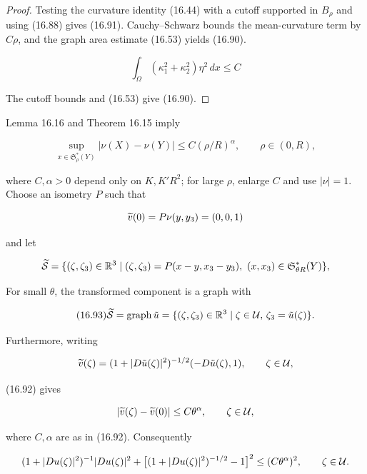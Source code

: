 \begin{proof}
\sketch Testing the curvature identity (16.44) with a cutoff supported in $B_\rho$ and using (16.88) gives (16.91). Cauchy--Schwarz bounds the mean-curvature term by $C\rho$, and the graph area estimate (16.53) yields (16.90).


\begin{equation}
\tag{16.91}
\int_{\Omega} (\kappa_1^2 + \kappa_2^2)\eta^2\,dx \leq C
\end{equation}

The cutoff bounds and (16.53) give (16.90).
\end{proof}

Lemma 16.16 and Theorem 16.15 imply

\begin{equation}
\tag{16.92}
\sup_{x \in \mathfrak{S}_{\rho}^*(Y)} |\nu(X) - \nu(Y)| \leq C(\rho/R)^{\alpha}, \qquad \rho \in (0, R),
\end{equation}

where $C,\alpha>0$ depend only on $K,K'R^2$; for large $\rho$, enlarge
$C$ and use $|\nu|=1$.  Choose an isometry $P$ such that

\[
\widetilde{v}(0) = P\nu(y, y_3) = (0, 0, 1)
\]

and let

\[
\widetilde{\mathcal{S}} = \{(\zeta, \zeta_3) \in \mathbb{R}^3 \mid (\zeta, \zeta_3) = P(x - y, x_3 - y_3),\ (x, x_3) \in \mathfrak{S}_{\theta R}^*(Y)\},
\]

For small $\theta$, the transformed component is a graph with

\begin{equation}
\tag{16.93}
\widetilde{\mathcal{S}} = \operatorname{graph}\tilde u = \{(\zeta, \zeta_3) \in \mathbb{R}^3 \mid \zeta \in \mathcal U,\, \zeta_3 = \tilde u(\zeta)\}.
\end{equation}

Furthermore, writing

\[
\widetilde{v}(\zeta) = (1 + |D\tilde u(\zeta)|^2)^{-1/2}(-D\tilde u(\zeta), 1), \qquad \zeta \in \mathcal U,
\]






(16.92) gives

\[
|\widetilde{v}(\zeta)-\widetilde{v}(0)| \le C\theta^\alpha, \qquad \zeta\in\mathcal{U},
\]

where $C,\alpha$ are as in (16.92). Consequently

\[
(1+|Du(\zeta)|^2)^{-1}|Du(\zeta)|^2+\bigl[(1+|Du(\zeta)|^2)^{-1/2}-1\bigr]^2\le (C\theta^\alpha)^2,\qquad \zeta\in\mathcal{U}.
\]

